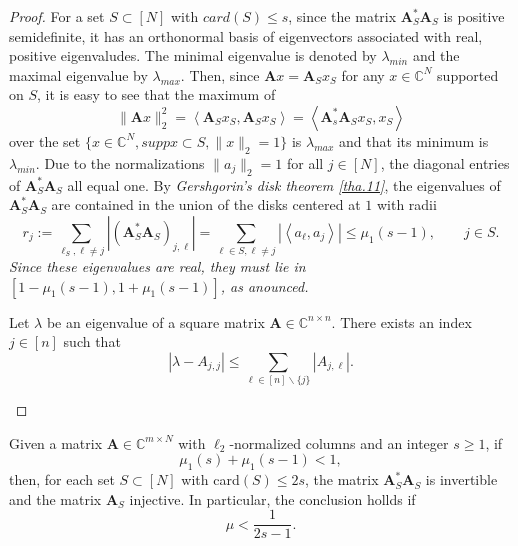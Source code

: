 \begin{proof}
    For a set $S \subset [N]$ with $card(S) \leq s$, since the matrix $\mathbf{A}_{S}^*\mathbf{A}_S$ is positive semidefinite, it has an orthonormal basis of eigenvectors associated with real, positive eigenvaludes. The minimal eigenvalue is denoted by $\lambda_{min}$ and the maximal eigenvalue by $\lambda_{max}$. Then, since $\mathbf{A}x = \mathbf{A}_Sx_S$ for any $x \in \mathbb{C}^N$ supported on $S$, it is easy to see that the maximum of 
    \[\|\mathbf{A}x\|_2^2 = \left<\mathbf{A}_Sx_S, \mathbf{A}_S x_S\right> = \left<\mathbf{A}_s^*\mathbf{A}_S x_S, x_S\right>\]
    over the set $\{x \in \mathbb{C}^N, supp x \subset S, \|x\|_2 = 1\}$ is $\lambda_{max}$ and that its minimum is $\lambda_{min}$. Due to the normalizations $\|a_j\|_2=1 $ for all $j \in [N]$, the diagonal entries of $\mathbf{A}_S^* \mathbf{A}_S$ all equal one. By \emph{Gershgorin's disk theorem \cref{tha.11}}, the eigenvalues of $\mathbf{A}_S^* \mathbf{A}_S$ are contained in the union of the disks centered at $1$ with radii
    \[r_j := \sum\limits_{\ell_S,\ell \neq j}\left|(\mathbf{A}_S^*\mathbf{A}_S)_{j,\ell}\right| = \sum\limits_{\ell \in S,\ell \neq j} \left|\left<a_{\ell},a_j\right>\right| \leq \mu_1(s-1), \qquad j\in S.\]
    \emph{\textcolor[rgb]{1,0,0}{Since these eigenvalues are real, they must lie in $\left[1- \mu_1(s-1), 1+\mu_1(s-1)\right]$, as anounced.}}

    \begin{theorem}
        Let $\lambda$ be an eigenvalue of a square matrix $\mathbf{A} \in \mathbb{C}^{n \times n}$. There exists an index $j \in [n]$ such that 
        \[|\lambda - A_{j,j}| \leq \sum\limits_{\ell \in [n] \backslash \{j\}} |A_{j,\ell}|.\]
    \label{tha.11}
    \end{theorem}
\end{proof}
\begin{corollary}
    \label{cr1.4}
    Given a matrix $\mathbf{A} \in \mathbb{C}^{m \times N}$ with $\ell_2$-normalized columns and an integer $s \geq 1$, if 
    \[\mu_1(s)+\mu_1(s-1) < 1,\]
    then, for each set $S \subset [N]$ with card$(S) \leq 2s$, the matrix $\mathbf{A}_S^*\mathbf{A}_S$ is invertible and the matrix $\mathbf{A}_S$ injective. In particular, the conclusion hollds if 
    \[\mu < \dfrac{1}{2s-1}.\]
\end{corollary}


